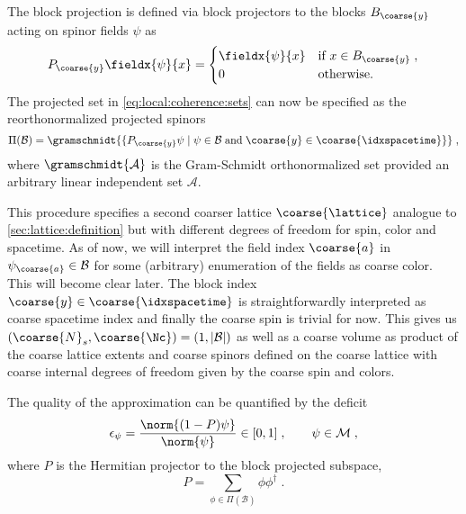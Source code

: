 The block projection is defined via block projectors to the blocks $B_{\coarse{y}}$ acting on spinor fields $\psi$ as
\begin{equation}
P_{\coarse{y}} \fieldx{\psi}{x} =
\begin{cases}
\fieldx{\psi}{x} & \text{if } x \in B_{\coarse{y}} \;, \\
0 & \text{otherwise.}
\end{cases}
\end{equation}
The projected set in \cref{eq:local:coherence:sets} can now be specified as the reorthonormalized projected spinors
\begin{equation}
\Pi(\mathcal{B}) = \gramschmidt{ \{ P_{\coarse{y}}\psi \mid \psi \in \mathcal{B} \; \text{and} \; \coarse{y} \in \coarse{\idxspacetime} \} } \;,
\end{equation}
where $\gramschmidt{\mathcal{A}}$ is the Gram-Schmidt orthonormalized set provided an arbitrary linear independent set $\mathcal{A}$.

This procedure specifies a second coarser lattice $\coarse{\lattice}$ analogue to \cref{sec:lattice:definition} but with different degrees of freedom for spin, color and spacetime.
As of now, we will interpret the field index $\coarse{a}$ in $\psi_{\coarse{a}} \in \mathcal{B}$ for some (arbitrary) enumeration of the fields as coarse color.
This will become clear later.
The block index $\coarse{y} \in \coarse{\idxspacetime}$ is straightforwardly interpreted as coarse spacetime index and finally the coarse spin is trivial for now.
This gives us $(\coarse{N}_s, \coarse{\Nc}) = (1, \lvert \mathcal{B} \rvert)$ as well as a coarse volume as product of the coarse lattice extents and coarse spinors defined on the coarse lattice with coarse internal degrees of freedom given by the coarse spin and colors.

The quality of the approximation can be quantified by the deficit
\begin{equation}
\epsilon_{\psi} = \frac{\norm{ (1-P) \psi }}{\norm{\psi}} \in [0,1] \;,
\qquad
\psi \in \mathcal{M} \;,
\end{equation}
where $P$ is the Hermitian projector to the block projected subspace,
\begin{equation} \label{eq:lc:projector}
P = \sum_{\phi \in \Pi(\mathcal{B})} \phi \phi^{\dagger} \;.
\end{equation}

